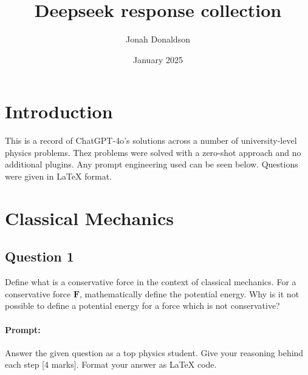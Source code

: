 \documentclass{article}
\title{Deepseek response collection}
\author{Jonah Donaldson}
\date{January 2025}
\begin{document}
\maketitle

\tableofcontents
\newpage

\section{Introduction}

This is a record of ChatGPT-4o's solutions across a number of university-level physics problems. Thez problems were solved with a zero-shot approach and no additional plugins. Any prompt engineering used can be seen below. Questions were given in LaTeX format.

\section{Classical Mechanics}

\subsection{Question 1}
Define what is a conservative force in the context of classical mechanics. For a conservative force $\mathbf{F}$, mathematically define the potential energy. Why is it not possible to define a potential energy for a force which is not conservative?

\paragraph{Prompt: \\} 
Answer the given question as a top physics student. Give your reasoning behind each step [4 marks].
Format your answer as LaTeX code.
\end{document}
